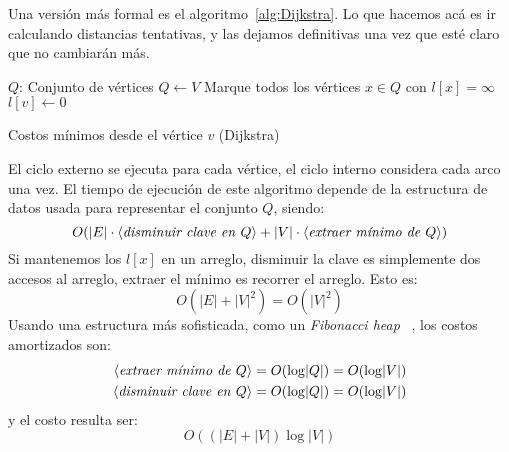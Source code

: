   Una versión más formal es el algoritmo~\ref{alg:Dijkstra}.
  Lo que hacemos acá es ir calculando distancias tentativas,
  y las dejamos definitivas
  una vez que esté claro que no cambiarán más.
  \begin{algorithm}[htbp]
    \DontPrintSemicolon

    \KwProcedure {} \;
    \BlankLine
    \KwVariables \(Q\): Conjunto de vértices \;
    \BlankLine
    \(Q \leftarrow V\) \;
    Marque todos los vértices \(x \in Q\) con \(l[x] = \infty\) \;
    \(l[v] \leftarrow 0\) \;
    \caption{Costos mínimos desde el vértice $v$ (Dijkstra)}
    \label{alg:Dijkstra}
  \end{algorithm}
  El ciclo externo se ejecuta para cada vértice,
  el ciclo interno considera cada arco una vez.
  El tiempo de ejecución de este algoritmo
  depende de la estructura de datos
  usada para representar el conjunto \(Q\),
  siendo:
  \begin{equation*}
    O(\lvert E \rvert
	  \cdot \left\langle
		  \text{\emph{disminuir clave en}\ \(Q\)}
		\right\rangle
	+ \lvert V \rvert
	    \cdot \left\langle
		    \text{\emph{extraer mínimo de}\ \(Q\)}
		  \right\rangle)
  \end{equation*}
  Si mantenemos los \(l[x]\) en un arreglo,
  disminuir la clave es simplemente dos accesos al arreglo,
  extraer el mínimo es recorrer el arreglo.
  Esto es:
  \begin{equation*}
    O(\lvert E \rvert + \lvert V \rvert^2)
      = O(\lvert V \rvert^2)
  \end{equation*}
  Usando una estructura más sofisticada,
  como un \emph{\foreignlanguage{english}{Fibonacci heap}}~%
     \cite{fredman87:_fibonacci_heaps},
  los costos amortizados son:
  \begin{align*}
    \left\langle
      \text{\emph{extraer mínimo de}\ \(Q\)}
    \right\rangle
      &= O(\log \lvert Q \rvert)
       = O(\log \lvert V \rvert) \\
    \left\langle
      \text{\emph{disminuir clave en}\ \(Q\)}
    \right\rangle
      &= O(\log \lvert Q \rvert)
       = O(\log \lvert V \rvert)
  \end{align*}
  y el costo resulta ser:
  \begin{equation*}
    O\left( (\lvert E \rvert
	      + \lvert V \rvert) \log \lvert V \rvert \right)
  \end{equation*}

